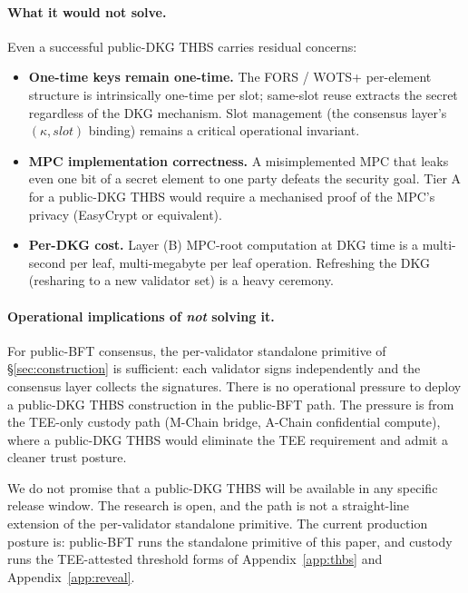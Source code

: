 \paragraph{What it would not solve.} Even a successful
public-DKG THBS carries residual concerns:
\begin{itemize}[leftmargin=2em,nosep]
  \item \textbf{One-time keys remain one-time.} The FORS / WOTS+
        per-element structure is intrinsically one-time per
        slot; same-slot reuse extracts the secret regardless of
        the DKG mechanism. Slot management (the consensus
        layer's $(\kappa, \mathit{slot})$ binding) remains a
        critical operational invariant.
  \item \textbf{MPC implementation correctness.} A
        misimplemented MPC that leaks even one bit of a secret
        element to one party defeats the security goal. Tier A
        for a public-DKG THBS would require a mechanised proof
        of the MPC's privacy (EasyCrypt or equivalent).
  \item \textbf{Per-DKG cost.} Layer (B) MPC-root computation
        at DKG time is a multi-second per leaf, multi-megabyte
        per leaf operation. Refreshing the DKG (resharing to a
        new validator set) is a heavy ceremony.
\end{itemize}

\paragraph{Operational implications of \emph{not} solving it.}
For public-BFT consensus, the per-validator standalone primitive
of \S\ref{sec:construction} is sufficient: each validator signs
independently and the consensus layer collects the signatures.
There is no operational pressure to deploy a public-DKG THBS
construction in the public-BFT path. The pressure is from the
TEE-only custody path (M-Chain bridge, A-Chain confidential
compute), where a public-DKG THBS would eliminate the TEE
requirement and admit a cleaner trust posture.

We do not promise that a public-DKG THBS will be available in
any specific release window. The research is open, and the path
is not a straight-line extension of the per-validator standalone
primitive. The current production posture is: public-BFT runs
the standalone primitive of this paper, and custody runs the
TEE-attested threshold forms of Appendix~\ref{app:thbs} and
Appendix~\ref{app:reveal}.

